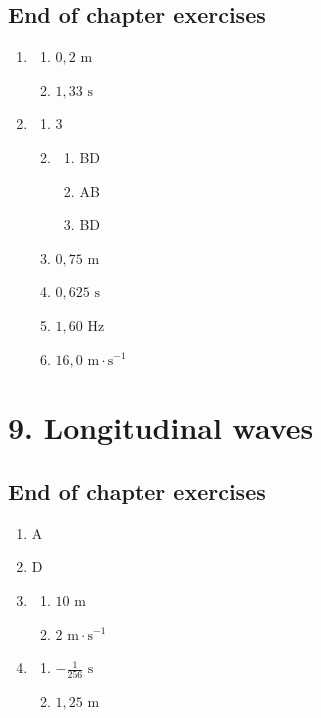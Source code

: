 \subsection{End of chapter exercises} 
\begin{multicols}{4}
\begin{enumerate}[noitemsep, label=\textbf{\arabic*}. ] 
\item %
 \begin{enumerate}[noitemsep, label=\textbf{(\alph*)} ]
\item $0,2 \text{ m}$
\item $1,33 \text{ s}$
\end{enumerate}
\item %
 \begin{enumerate}[noitemsep, label=\textbf{(\alph*)} ]
\item $3$
\item 
\begin{enumerate}[noitemsep, label=\textbf{(\roman*)} ]
\item BD
\item AB
\item BD
\end{enumerate}
\item $0,75 \text{ m}$
\item $0,625 \text{ s}$
\item $1,60 \text{ Hz}$
\item $16,0 \text{ m} \cdot \text{s}^{-1}$
\end{enumerate}
\end{enumerate}
\end{multicols}
\section {9. Longitudinal waves}
\subsection{End of chapter exercises} 
\begin{multicols}{3}
  \begin{enumerate}[noitemsep, label=\textbf{\arabic*}.]
  \item %
A
  \item %
D
  \item %
\begin{enumerate}[noitemsep, label=\textbf{\alph*}.]
 \item $10 \text{ m}$
\item $2 \text{ m} \cdot \text{s}^{-1}$
\end{enumerate} 
  \item %
\begin{enumerate}[noitemsep, label=\textbf{\alph*}.]
 \item $-\frac{1}{256} \text{ s}$
\item $1,25 \text{ m}$
\end{enumerate}
  \end{enumerate}
\end{multicols}
